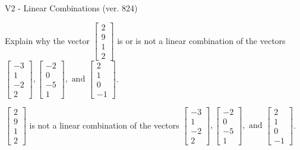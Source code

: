 \begin{exercise}
  \begin{exerciseTitle}V2 - Linear Combinations (ver. 824)\end{exerciseTitle}
  \begin{exerciseStatement}
    Explain why the vector \(\left[\begin{array}{c}
2 \\
9 \\
1 \\
2
\end{array}\right]\)  is or is not a linear 
	combination of the vectors \(\left[\begin{array}{c}
-3 \\
1 \\
-2 \\
2
\end{array}\right] , \left[\begin{array}{c}
-2 \\
0 \\
-5 \\
1
\end{array}\right] , \text{ and } \left[\begin{array}{c}
2 \\
1 \\
0 \\
-1
\end{array}\right]\).
	


  \end{exerciseStatement}
  \begin{exerciseAnswer}
   \(\left[\begin{array}{c}
2 \\
9 \\
1 \\
2
\end{array}\right]\) 
  	 is not  
	a linear combination of the vectors \(\left[\begin{array}{c}
-3 \\
1 \\
-2 \\
2
\end{array}\right] , \left[\begin{array}{c}
-2 \\
0 \\
-5 \\
1
\end{array}\right] , \text{ and } \left[\begin{array}{c}
2 \\
1 \\
0 \\
-1
\end{array}\right]\).

	
  


  \end{exerciseAnswer}
\end{exercise}
